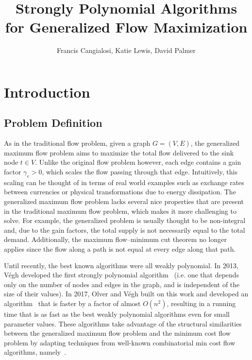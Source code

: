 \documentclass[11pt]{article}
\title{Strongly Polynomial Algorithms for Generalized Flow Maximization}
\author{Francis Cangialosi, Katie Lewis, David Palmer}
\date{}
\theoremstyle{definition}
\theoremstyle{definition}
\theoremstyle{definition}
\begin{document}
\maketitle
\section{Introduction}\label{sec:intro}
	\subsection{Problem Definition}\label{sec:problem}
	As in the traditional flow problem, given a
	graph $G = (V,E)$, the generalized maximum flow problem aims to maximize the
	total flow delivered to the sink node $t \in V$. Unlike the original flow
	problem however, each edge contains a gain factor $\gamma_e > 0$, which scales
	the flow passing through that edge. Intuitively, this scaling can be thought
	of in terms of real world examples such as exchange rates between currencies
	or physical transformations due to energy dissipation. The generalized maximum
	flow problem lacks several nice properties that are present in the traditional
	maximum flow problem, which makes it more challenging to solve. For example,
	the generalized problem is usually thought to be non-integral and,
	due to the gain factors, the total supply is not necessarily equal to the total
	demand. Additionally, the maximum flow--minimum cut theorem no longer applies
	since the flow along a path is not equal at every edge along that path.
    
	Until recently, the best known algorithms were all weakly polynomial. In
	2013, Végh developed the first strongly polynomial algorithm~\cite{Vegh2013}
	(i.e. one that depends only on the number of nodes and edges in the graph,
	and is independent of the size of their values). In 2017, Olver and Végh
	built on this work and developed an algorithm~\cite{Olver2017}
    that is faster by a factor of
	almost $O(n^2)$, resulting in a running time that is as fast as the best
	weakly polynomial algorithms even for small parameter values. These
	algorithms take advantage of the structural similarities between the
	generalized maximum flow problem and the minimum cost flow problem by
	adapting techniques from well-known combinatorial min cost flow algorithms,
    namely~\cite{Orlin1988}.
    
\end{document}
